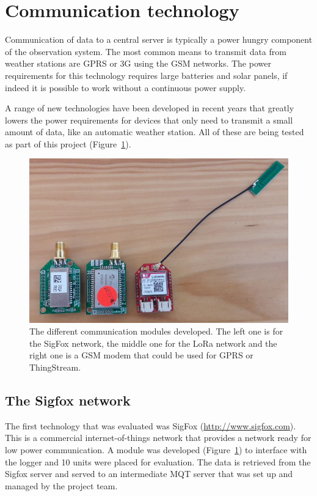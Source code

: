 \documentclass{wrcreport}
\begin{document}
\section{Communication technology}

Communication of data to a central server is typically a power hungry component of the observation system. The most common means to transmit data from weather stations are GPRS or 3G using the GSM networks. The power requirements for this technology requires large batteries and solar panels, if indeed it is possible to work without a continuous power supply.

A range of new technologies have been developed in recent years that greatly lowers the power requirements for devices that only need to transmit a small amount of data, like an automatic weather station. All of these are being tested as part of this project (Figure~\ref{fig:bees}).

\begin{figure}[!htp]
  \begin{center}
    \includegraphics[width=\textwidth]{Bees.jpg}
  \end{center}
  \caption[The different communication modules developed.]{The different communication modules developed. The left one is for the SigFox network, the middle one for the LoRa network and the right one is a GSM modem that could be used for GPRS or ThingStream.}
\label{fig:bees}
\end{figure}

\subsection{The Sigfox network}

The first technology that was evaluated was SigFox (\url{http://www.sigfox.com}). This is a commercial internet-of-things network that provides a network ready for low power communication. A module was developed (Figure~\ref{fig:bees}) to interface with the logger and 10 units were placed for evaluation. The data is retrieved from the Sigfox server and served to an intermediate MQT server that was set up and managed by the project team. 
\end{document}
